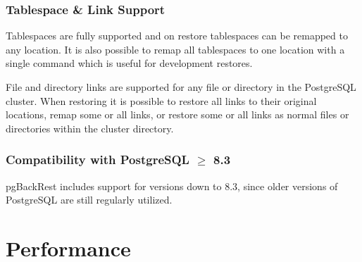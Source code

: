 \documentclass[hyperref={pdfpagelabels=false}]{beamer}
\begin{document}
    \begin{frame}
        \frametitle{Tablespace \& Link Support}

        Tablespaces are fully supported and on restore tablespaces can be remapped to any location. It is also possible to remap all tablespaces to one location with a single command which is useful for development restores.
        \par
        File and directory links are supported for any file or directory in the PostgreSQL cluster. When restoring it is possible to restore all links to their original locations, remap some or all links, or restore some or all links as normal files or directories within the cluster directory.
    \end{frame}

    \begin{frame}
        \frametitle{Compatibility with PostgreSQL $\geqslant$ 8.3}

        pgBackRest includes support for versions down to 8.3, since older versions of PostgreSQL are still regularly utilized.
    \end{frame}

    \section{Performance}
\end{document}
